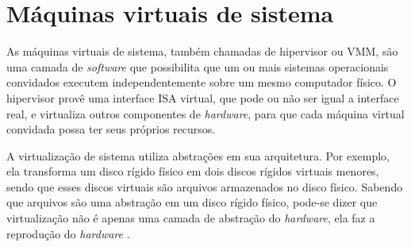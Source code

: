 
\section{Máquinas virtuais de sistema}
\label{section:virtsistema}

As máquinas virtuais de sistema, também chamadas de hipervisor ou \ac{VMM}, são uma camada de \textit{software} que possibilita
que um ou mais sistemas operacionais convidados executem independentemente sobre um mesmo computador físico. O hipervisor provê uma interface
\ac{ISA} virtual, que pode ou não ser igual a interface real, e virtualiza outros componentes de \textit{hardware}, para que cada máquina
virtual convidada possa ter seus próprios recursos.

A virtualização de sistema utiliza abstrações em sua arquitetura. Por exemplo, ela transforma um disco rígido físico em dois discos rígidos
virtuais menores, sendo que esses discos virtuais são arquivos armazenados no disco físico. Sabendo que arquivos são uma abstração
em um disco rígido físico, pode-se dizer que virtualização não é apenas uma camada de abstração do \textit{hardware}, ela faz a reprodução 
do \textit{hardware} \cite{smithenair2005}.

